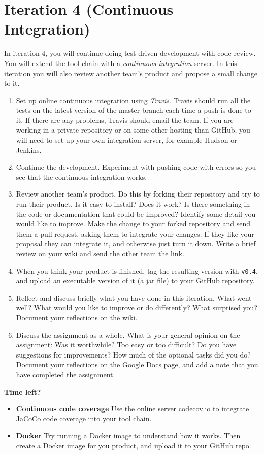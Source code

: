 \documentclass[swedish,english]{article}
\begin{document}
\section*{Iteration 4 (Continuous Integration)}
In iteration 4, you will continue doing test-driven development with code review. You will extend the tool chain with a \emph{continuous integration} server. In this iteration you will also review another team's product and propose a small change to it.

\begin{enumerate}
\item Set up online continuous integration using \emph{Travis}. Travis should run all the tests on the latest version of the master branch each time a push is done to it. If there are any problems, Travis should email the team. If you are working in a private repository or on some other hosting than GitHub, you will need to set up your own integration server, for example Hudson or Jenkins.
\item Continue the development. Experiment with pushing code with errors so you see that the continuous integration works.
\item Review another team's product. Do this by forking their repository and try to run their product. Is it easy to install? Does it work? Is there something in the code or documentation that could be improved? Identify some detail you would like to improve. Make the change to your forked repository and send them a pull request, asking them to integrate your changes. If they like your proposal they can integrate it, and otherwise just turn it down. Write a brief review on your wiki and send the other team the link.
\item When you think your product is finished, tag the resulting version with \verb'v0.4', and upload an executable version of it (a jar file) to your GitHub repository.
\item Reflect and discuss briefly what you have done in this iteration. What went well? What would you like to improve or do differently? What surprised you? Document your reflections on the wiki.

\item Discuss the assignment as a whole. What is your general opinion on the assignment: Was it worthwhile? Too easy or too difficult? Do you have suggestions for improvements? How much of the optional tasks did you do? Document your reflections on the Google Docs page, and add a note that you have completed the assignment.

\end{enumerate}

\textbf{Time left?}

\begin{itemize}
\item \textbf{Continuous code coverage} Use the online server codecov.io to integrate JaCoCo code coverage into your tool chain.
\item \textbf{Docker} Try running a Docker image to understand how it works. Then create a Docker image for you product, and upload it to your GitHub repo.
\end{itemize}
 
\end{document}

